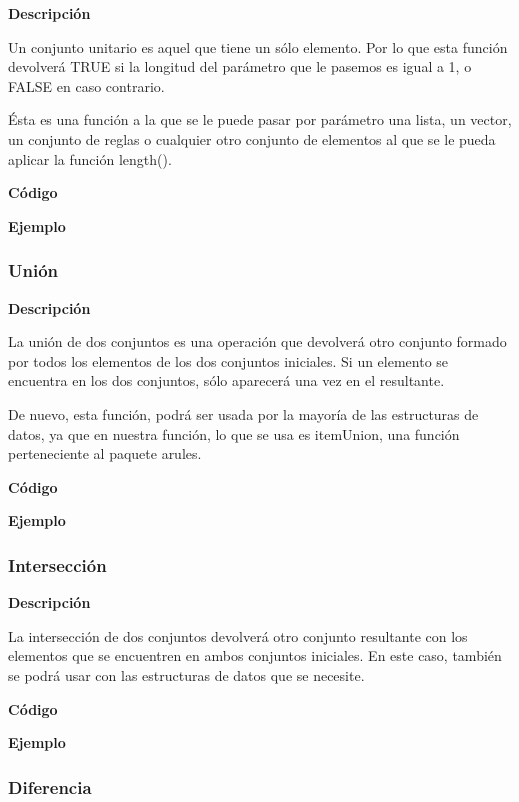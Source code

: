     \textbf{Descripci\'on}
    
    Un conjunto unitario es aquel que tiene un s\'olo elemento. Por lo que esta funci\'on 
    devolver\'a TRUE si la longitud del par\'ametro que le pasemos es igual a 1, o FALSE en caso 
    contrario.

    \'Esta es una funci\'on a la que se le puede pasar por par\'ametro una lista, un vector, 
    un conjunto de reglas o cualquier otro conjunto de elementos al que se le pueda aplicar la funci\'on 
    length().


    \textbf{C\'odigo}

    
    \textbf{Ejemplo}



\subsubsection{Uni\'on}

    \textbf{Descripci\'on}

    La uni\'on de dos conjuntos es una operaci\'on que devolver\'a otro conjunto formado por 
    todos los elementos de los dos conjuntos iniciales. Si un elemento se encuentra en los dos 
    conjuntos, s\'olo aparecer\'a una vez en el resultante.
    
    De nuevo, esta funci\'on, podr\'a ser usada por la mayor\'ia de las estructuras de datos, ya que en 
    nuestra funci\'on, lo que se usa es itemUnion, una funci\'on perteneciente al paquete arules.

    \textbf{C\'odigo}

    
    \textbf{Ejemplo}




\subsubsection{Intersecci\'on}

    \textbf{Descripci\'on}
    
    La intersecci\'on de dos conjuntos devolver\'a otro conjunto resultante con los elementos 
    que se encuentren en ambos conjuntos iniciales. En este caso, tambi\'en se podr\'a usar con las 
    estructuras de datos que se necesite.

    \textbf{C\'odigo}

    
    \textbf{Ejemplo}




\subsubsection{Diferencia}

